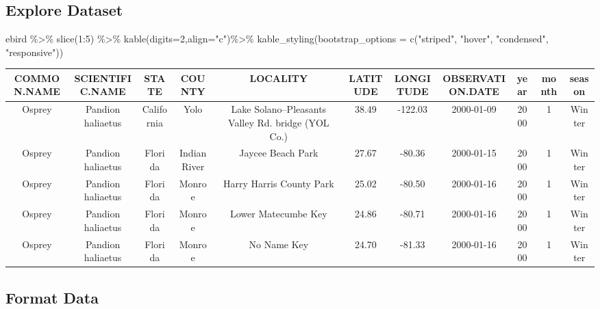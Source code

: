 \documentclass[
  letterpaper,
  DIV=11,
  numbers=noendperiod]{scrartcl}
\newenvironment{Shaded}{\begin{snugshade}}{\end{snugshade}}
\newcommand{\AttributeTok}[1]{\textcolor[rgb]{0.40,0.45,0.13}{#1}}
\newcommand{\DecValTok}[1]{\textcolor[rgb]{0.68,0.00,0.00}{#1}}
\newcommand{\FunctionTok}[1]{\textcolor[rgb]{0.28,0.35,0.67}{#1}}
\newcommand{\NormalTok}[1]{\textcolor[rgb]{0.00,0.23,0.31}{#1}}
\newcommand{\SpecialCharTok}[1]{\textcolor[rgb]{0.37,0.37,0.37}{#1}}
\newcommand{\StringTok}[1]{\textcolor[rgb]{0.13,0.47,0.30}{#1}}
\begin{document}
\subsection{Explore Dataset}\label{explore-dataset}

\begin{Shaded}
\begin{Highlighting}[]
\NormalTok{ebird }\SpecialCharTok{\%\textgreater{}\%} 
  \FunctionTok{slice}\NormalTok{(}\DecValTok{1}\SpecialCharTok{:}\DecValTok{5}\NormalTok{) }\SpecialCharTok{\%\textgreater{}\%} 
  \FunctionTok{kable}\NormalTok{(}\AttributeTok{digits=}\DecValTok{2}\NormalTok{,}\AttributeTok{align=}\StringTok{"c"}\NormalTok{)}\SpecialCharTok{\%\textgreater{}\%} 
  \FunctionTok{kable\_styling}\NormalTok{(}\AttributeTok{bootstrap\_options =} 
                  \FunctionTok{c}\NormalTok{(}\StringTok{"striped"}\NormalTok{, }\StringTok{"hover"}\NormalTok{, }\StringTok{"condensed"}\NormalTok{, }\StringTok{"responsive"}\NormalTok{))}
\end{Highlighting}
\end{Shaded}

\begin{longtable*}[t]{ccccccccccc}
\toprule
COMMON.NAME & SCIENTIFIC.NAME & STATE & COUNTY & LOCALITY & LATITUDE & LONGITUDE & OBSERVATION.DATE & year & month & season\\
\midrule
Osprey & Pandion haliaetus & California & Yolo & Lake Solano--Pleasants Valley Rd. bridge (YOL Co.) & 38.49 & -122.03 & 2000-01-09 & 2000 & 1 & Winter\\
Osprey & Pandion haliaetus & Florida & Indian River & Jaycee Beach Park & 27.67 & -80.36 & 2000-01-15 & 2000 & 1 & Winter\\
Osprey & Pandion haliaetus & Florida & Monroe & Harry Harris County Park & 25.02 & -80.50 & 2000-01-16 & 2000 & 1 & Winter\\
Osprey & Pandion haliaetus & Florida & Monroe & Lower Matecumbe Key & 24.86 & -80.71 & 2000-01-16 & 2000 & 1 & Winter\\
Osprey & Pandion haliaetus & Florida & Monroe & No Name Key & 24.70 & -81.33 & 2000-01-16 & 2000 & 1 & Winter\\
\bottomrule
\end{longtable*}

\subsection{Format Data}\label{format-data}
\end{document}
